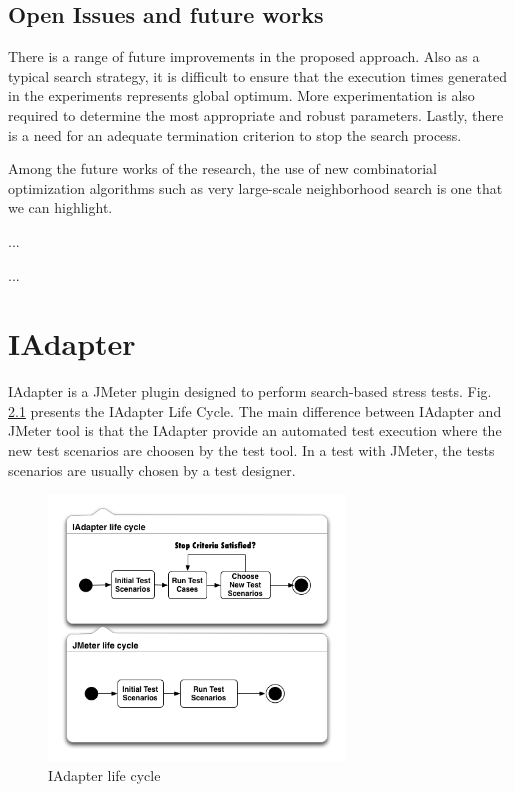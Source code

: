 \documentclass{report}
\begin{document}
\section{Open Issues and future works}

There is a range of future improvements in the proposed approach. Also as a typical search strategy, it is difficult to ensure that the execution times generated in the experiments represents global optimum. More experimentation is also required to determine the
most appropriate and robust parameters. Lastly, there is a need for an adequate termination criterion to stop the search process.


Among the future works of the research, the use of new combinatorial optimization algorithms such as very large-scale neighborhood search is one that we can highlight.

...
\appendix

...



\chapter{IAdapter }



IAdapter is a JMeter plugin designed to perform search-based stress tests. Fig. \ref{fig:iadapterlifecycle} presents the IAdapter Life Cycle. The main difference between IAdapter and JMeter tool is that the IAdapter provide an automated test execution where the new test scenarios are choosen by the test tool.  In a test with JMeter, the tests scenarios are usually chosen by a test designer.

\begin{figure}[h]
\centering
\includegraphics[width=0.7\textwidth]{./images/lifecycle2.png}
\caption{IAdapter life cycle}
\label{fig:iadapterlifecycle}
\end{figure}
\end{document}

